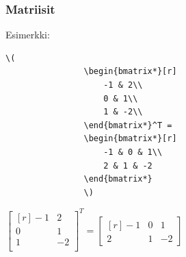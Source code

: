 \documentclass[handout,hyperref={colorlinks=true}]{beamer}
\theoremstyle{remark}
\newcommand{\vaihto}{\\ \vspace{10pt}}
\begin{document}
\begin{frame}[fragile]
    \frametitle{Matriisit}

    Esimerkki:\vaihto
    \begin{minipage}{5cm}
        \begin{scriptsize}
            \begin{Verbatim}[frame=single]
                \(
                \begin{bmatrix*}[r]
                    -1 & 2\\
                    0 & 1\\
                    1 & -2\\
                \end{bmatrix*}^T = 
                \begin{bmatrix*}[r]
                    -1 & 0 & 1\\
                    2 & 1 & -2
                \end{bmatrix*}
                \)
            \end{Verbatim}
        \end{scriptsize}
    \end{minipage}
    \begin{minipage}{5cm}
        \(
        \begin{bmatrix*}[r]
            -1 & 2\\
            0 & 1\\
            1 & -2\\
        \end{bmatrix*}^T = 
        \begin{bmatrix*}[r]
            -1 & 0 & 1\\
            2 & 1 & -2
        \end{bmatrix*}
        \)
    \end{minipage}
\end{frame}
\end{document}
